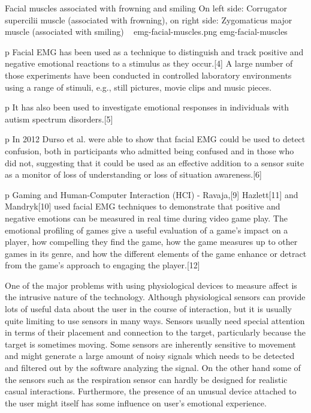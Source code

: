 \img
{Facial muscles associated with frowning and smiling}
{On left side: Corrugator supercilii muscle (associated with frowning), on right side: Zygomaticus major muscle (associated with smiling) ~\cite{wiki2014facial}}
{emg-facial-muscles.png}
{emg-facial-muscles}

p Facial EMG has been used as a technique to distinguish and track positive and negative emotional reactions to a stimulus as they occur.[4] A large number of those experiments have been conducted in controlled laboratory environments using a range of stimuli, e.g., still pictures, movie clips and music pieces.

p It has also been used to investigate emotional responses in individuals with autism spectrum disorders.[5]

p In 2012 Durso et al. were able to show that facial EMG could be used to detect confusion, both in participants who admitted being confused and in those who did not, suggesting that it could be used as an effective addition to a sensor suite as a monitor of loss of understanding or loss of situation awareness.[6]

p Gaming and Human-Computer Interaction (HCI) - Ravaja,[9] Hazlett[11] and Mandryk[10] used facial EMG techniques to demonstrate that positive and negative emotions can be measured in real time during video game play. The emotional profiling of games give a useful evaluation of a game's impact on a player, how compelling they find the game, how the game measures up to other games in its genre, and how the different elements of the game enhance or detract from the game's approach to engaging the player.[12]


One of the major problems with using physiological devices to measure affect is the intrusive nature of the technology. Although physiological sensors can provide lots of useful data about the user in the course of interaction, but  it is usually quite limiting to use sensors in many ways. Sensors usually need special attention in terms of their placement and connection to the target, particularly because the target is sometimes moving. Some sensors are inherently sensitive to movement and might generate a large amount of noisy signals which needs to be detected and filtered out by the software analyzing the signal. On the other hand some of the sensors such as the respiration sensor can hardly be designed for realistic casual interactions. Furthermore, the presence of an unusual device attached to the user might itself has some influence on user's emotional experience.

